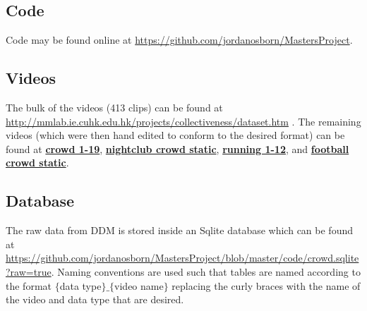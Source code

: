 \documentclass[11pt]{article}
\let\oldhref\href
\renewcommand{\href}[2]{\oldhref{#1}{\bfseries#2}}
\begin{document}
\subsection{Code}
Code may be found online at \url{https://github.com/jordanosborn/MastersProject}.
\subsection{Videos}
The bulk of the videos (413 clips) can be found at \url{http://mmlab.ie.cuhk.edu.hk/projects/collectiveness/dataset.htm} \cite{crowdMotionDB}. The remaining videos (which were then hand edited to conform to the desired format) can be found at \href{https://www.youtube.com/watch?v=nrST7C_mDT8}{crowd 1-19}, \href{https://www.youtube.com/watch?v=lpEF1uyCH44}{nightclub crowd static},  \href{https://www.youtube.com/watch?v=sj2er0LPlH0}{running 1-12}, and \href{https://www.youtube.com/watch?v=AQdZ2OTF7VA}{football crowd static}.
\subsection{Database}
The raw data from DDM is stored inside an Sqlite database which can be found at \url{https://github.com/jordanosborn/MastersProject/blob/master/code/crowd.sqlite?raw=true}. Naming conventions are used such that tables are named according to the format $\{$data type$\}\_\{$video name$\}$ replacing the curly braces with the name of the video and data type that are desired.
\end{document}
